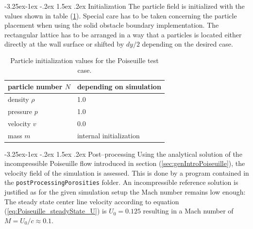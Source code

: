 \documentclass[11pt,a4paper,twoside]{report}
\makeatletter
\renewcommand\paragraph{\@startsection{paragraph}{4}{\z@}%
  {-3.25ex\@plus -1ex \@minus -.2ex}%
  {1.5ex \@plus .2ex}%
  {\normalfont\normalsize\bfseries}}
\makeatother
\begin{document}
\paragraph {Initialization}
The particle field is initialized with the values shown in table (\ref{tab:InitPartValues_Poiseuille}). Special care has to be taken concerning the particle placement when using the solid obstacle boundary implementation. The rectangular lattice has to be arranged in a way that a particles is located either directly at the wall surface or shifted by $dy/2$ depending on the desired case.  

\begin{table}[h] %
\label{tab:InitPartValues_Poiseuille}
\centering

\begin{tabular}[c]{|l|p{5cm}|} %
\hline
\hline
particle number $N$ &  depending on simulation\\
\hline
density $\rho$ &  1.0\\
\hline
pressure $p$ &  1.0 \\
\hline
velocity $v$ & 0.0\\
\hline
mass $m$ & internal initialization\\
\hline
\hline
\end{tabular}
\caption[]{Particle initialization values for the Poiseuille test case.}

\end{table}


\paragraph{Post--processing}
Using the analytical solution of the incompressible Poiseuille flow introduced in section (\ref{sec:genIntroPoiseuille}), the velocity field of the simulation is assessed. This is done by a program contained in the {\tt postProcessingPorosities} folder. An incompressible reference solution is justified as for the given simulation setup the Mach number remains low enough: The steady state center line velocity according to equation (\ref{eq:Poiseuille_steadyState_U}) is $U_0=0.125$ resulting in a Mach number of $M=U_0/c\approx0.1$. 

\end{document}
